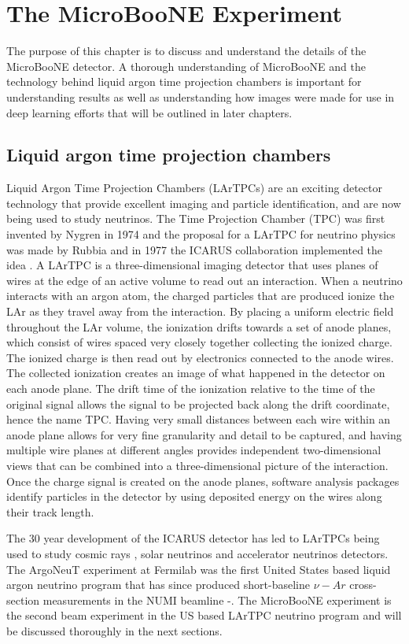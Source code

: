 \chapter{The MicroBooNE Experiment}\label{ch:microboone}
The purpose of this chapter is to discuss and understand the details of the MicroBooNE detector. A thorough understanding of MicroBooNE and the technology behind liquid argon time projection chambers is important for understanding results as well as understanding how images were made for use in deep learning efforts that will be outlined in later chapters.   

\section{Liquid argon time projection chambers}
Liquid Argon Time Projection Chambers (LArTPCs) are an exciting detector technology that provide excellent imaging and particle identification, and are now being used to study neutrinos. The Time Projection Chamber (TPC) was first invented by Nygren in 1974 \cite{nygren} and the proposal for a LArTPC for neutrino physics was made by Rubbia \cite{rubbia} and in 1977 the ICARUS collaboration implemented the idea \cite{icarus}. A LArTPC is a three-dimensional imaging detector that uses planes of wires at the edge of an active volume to read out an interaction. When a neutrino interacts with an argon atom, the charged particles that are produced ionize the LAr as they travel away from the interaction. By placing a uniform electric field throughout the LAr volume, the ionization drifts towards a set of anode planes, which consist of wires spaced very closely together collecting the ionized charge. The ionized charge is then read out by electronics connected to the anode wires. The collected ionization creates an image of what happened in the detector on each anode plane. The drift time of the ionization relative to the time of the original signal allows the signal to be projected back along the drift coordinate, hence the name TPC. Having very small distances between each wire within an anode plane allows for very fine granularity and detail to be captured, and having multiple wire planes at different angles provides independent two-dimensional views that can be combined into a three-dimensional picture of the interaction. Once the charge signal is created on the anode planes, software analysis packages identify particles in the detector by using deposited energy on the wires along their track length. 

The 30 year development of the ICARUS detector has led to LArTPCs being used to study cosmic rays \cite{lartpc_cosmic}, solar neutrinos \cite{lartpc_solar} and accelerator neutrinos \cite{lartpc_accelerator} detectors. The ArgoNeuT experiment at Fermilab was the first United States based liquid argon neutrino program that has since produced short-baseline $\nu-Ar$ cross-section measurements in the NUMI beamline \cite{argoneut1}-\cite{argoneut4}. The MicroBooNE experiment is the second beam experiment in the US based LArTPC neutrino program and will be discussed thoroughly in the next sections.  


